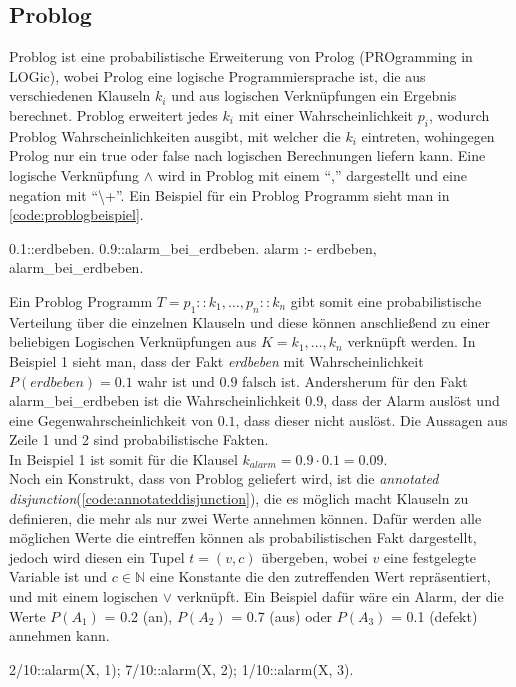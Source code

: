 \documentclass[german,version-2020-11]{uzl-thesis}
\begin{document}
\subsection{Problog}
Problog ist eine probabilistische Erweiterung von Prolog (PROgramming in LOGic), wobei Prolog eine logische Programmiersprache ist, die aus verschiedenen Klauseln $k_i$ und aus logischen Verknüpfungen ein Ergebnis berechnet. Problog erweitert jedes $k_i$ mit einer Wahrscheinlichkeit $p_i$, wodurch Problog  Wahrscheinlichkeiten ausgibt, mit welcher die $k_i$ eintreten, wohingegen Prolog nur ein true oder false nach logischen Berechnungen liefern kann. Eine logische Verknüpfung $\land$ wird in Problog mit einem \enquote{,} dargestellt und eine negation mit  \enquote{\textbackslash+}. Ein Beispiel für ein Problog Programm sieht man in \autoref{code:problogbeispiel}.
\begin{Pseudocode}[caption={Beispiel Problog Programm}, label={code:problogbeispiel}, numbers=left]
0.1::erdbeben.
0.9::alarm_bei_erdbeben.
alarm :- erdbeben, alarm_bei_erdbeben.
\end{Pseudocode} 
Ein Problog Programm $T = {p_1 :: k_1, \dots, p_n :: k_n}$ gibt somit eine probabilistische Verteilung über die einzelnen Klauseln und diese können anschließend zu einer beliebigen Logischen Verknüpfungen aus $K = {k_1 , \dots , k_n}$ verknüpft werden. In Beispiel 1 sieht man, dass der Fakt \textit{erdbeben} mit Wahrscheinlichkeit $ P(erdbeben) = 0.1$ wahr ist und $0.9$ falsch ist. Andersherum für den Fakt alarm\_bei\_erdbeben ist die Wahrscheinlichkeit $0.9$, dass der Alarm auslöst und eine Gegenwahrscheinlichkeit von $0.1$, dass dieser nicht auslöst. Die Aussagen aus Zeile 1 und 2 sind probabilistische Fakten.\\  In Beispiel 1 ist somit für die Klausel $k_{alarm} = 0.9 \cdot 0.1 = 0.09  $. \cite{4}\cite{5} \\ 
Noch ein Konstrukt, dass von Problog geliefert wird, ist die \textit{annotated disjunction}(\autoref{code:annotateddisjunction}), die es möglich macht Klauseln zu definieren, die mehr als nur zwei Werte annehmen können. Dafür werden alle möglichen Werte die eintreffen können als probabilistischen Fakt dargestellt, jedoch wird diesen ein Tupel $t = (v,c) $ übergeben, wobei $v$ eine festgelegte Variable ist und $c \in \mathbb{N}$ eine Konstante die den zutreffenden Wert repräsentiert, und  mit einem logischen $\lor$ verknüpft. Ein Beispiel dafür wäre ein Alarm, der die Werte $P(A_1)$ = 0.2 (an), $P(A_2)$ = 0.7 (aus) oder $P(A_3)$ = 0.1 (defekt) annehmen kann. \cite{5}
\begin{Pseudocode}[caption={Problog Beispiel \textit{annotated disjunction}}, label={code:annotateddisjunction}, numbers=left]
	2/10::alarm(X, 1); 7/10::alarm(X, 2); 1/10::alarm(X, 3).
\end{Pseudocode}
\end{document}
